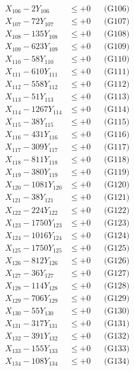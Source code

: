 \documentclass[a4paper,10pt]{article}
\begin{document}
{\begin{align}
X_{106} - 2Y_{106} &\leq +0 && \text{(G106)} \\
X_{107} - 72Y_{107} &\leq +0 && \text{(G107)} \\
X_{108} - 135Y_{108} &\leq +0 && \text{(G108)} \\
X_{109} - 623Y_{109} &\leq +0 && \text{(G109)} \\
X_{110} - 58Y_{110} &\leq +0 && \text{(G110)} \\
\allowbreak
X_{111} - 610Y_{111} &\leq +0 && \text{(G111)} \\
X_{112} - 558Y_{112} &\leq +0 && \text{(G112)} \\
X_{113} - 51Y_{113} &\leq +0 && \text{(G113)} \\
X_{114} - 1267Y_{114} &\leq +0 && \text{(G114)} \\
X_{115} - 38Y_{115} &\leq +0 && \text{(G115)} \\
X_{116} - 431Y_{116} &\leq +0 && \text{(G116)} \\
X_{117} - 309Y_{117} &\leq +0 && \text{(G117)} \\
X_{118} - 811Y_{118} &\leq +0 && \text{(G118)} \\
X_{119} - 380Y_{119} &\leq +0 && \text{(G119)} \\
X_{120} - 1081Y_{120} &\leq +0 && \text{(G120)} \\
\allowbreak
X_{121} - 38Y_{121} &\leq +0 && \text{(G121)} \\
X_{122} - 224Y_{122} &\leq +0 && \text{(G122)} \\
X_{123} - 1750Y_{123} &\leq +0 && \text{(G123)} \\
X_{124} - 1016Y_{124} &\leq +0 && \text{(G124)} \\
X_{125} - 1750Y_{125} &\leq +0 && \text{(G125)} \\
X_{126} - 812Y_{126} &\leq +0 && \text{(G126)} \\
X_{127} - 36Y_{127} &\leq +0 && \text{(G127)} \\
X_{128} - 114Y_{128} &\leq +0 && \text{(G128)} \\
X_{129} - 706Y_{129} &\leq +0 && \text{(G129)} \\
X_{130} - 55Y_{130} &\leq +0 && \text{(G130)} \\
\allowbreak
X_{131} - 317Y_{131} &\leq +0 && \text{(G131)} \\
X_{132} - 391Y_{132} &\leq +0 && \text{(G132)} \\
X_{133} - 155Y_{133} &\leq +0 && \text{(G133)} \\
X_{134} - 108Y_{134} &\leq +0 && \text{(G134)} \\

\end{align}}
\end{document}
